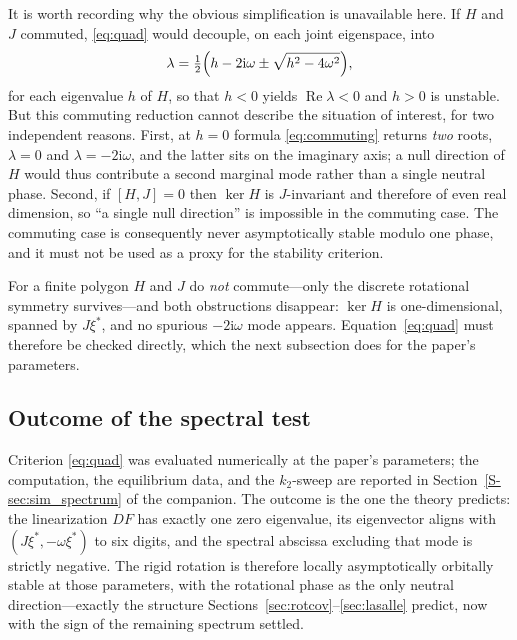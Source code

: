 It is worth recording why the obvious simplification is unavailable here. If $H$ and $J$ commuted,
\eqref{eq:quad} would decouple, on each joint eigenspace, into
\begin{equation}
  \lambda=\tfrac12\Bigl(h-2\mathrm{i}\omega\pm\sqrt{h^2-4\omega^2}\Bigr),
  \label{eq:commuting}
\end{equation}
for each eigenvalue $h$ of $H$, so that $h<0$ yields $\operatorname{Re}\lambda<0$ and $h>0$ is
unstable. But this commuting reduction cannot describe the situation of interest, for two independent
reasons. First, at $h=0$ formula \eqref{eq:commuting} returns \emph{two} roots, $\lambda=0$ and
$\lambda=-2\mathrm{i}\omega$, and the latter sits on the imaginary axis; a null direction of $H$ would
thus contribute a second marginal mode rather than a single neutral phase. Second, if $[H,J]=0$ then
$\ker H$ is $J$-invariant and therefore of even real dimension, so ``a single null direction'' is
impossible in the commuting case. The commuting case is consequently never asymptotically stable
modulo one phase, and it must not be used as a proxy for the stability criterion.

For a finite polygon $H$ and $J$ do \emph{not} commute---only the discrete rotational symmetry
survives---and both obstructions disappear: $\ker H$ is one-dimensional, spanned by $J\xi^*$, and no
spurious $-2\mathrm{i}\omega$ mode appears. Equation~\eqref{eq:quad} must therefore be checked
directly, which the next subsection does for the paper's parameters.

\subsection{Outcome of the spectral test}
\label{sec:verifyrot}

Criterion \eqref{eq:quad} was evaluated numerically at the paper's parameters; the computation, the
equilibrium data, and the $k_2$-sweep are reported in Section~\ref{S-sec:sim_spectrum} of the
companion. The outcome is the one the theory predicts: the linearization $DF$ has exactly one zero
eigenvalue, its eigenvector aligns with $(J\xi^*,-\omega\xi^*)$ to six digits, and the spectral
abscissa excluding that mode is strictly negative. The rigid rotation is therefore locally
asymptotically orbitally stable at those parameters, with the rotational phase as the only neutral
direction---exactly the structure Sections~\ref{sec:rotcov}--\ref{sec:lasalle} predict, now with the
sign of the remaining spectrum settled.

